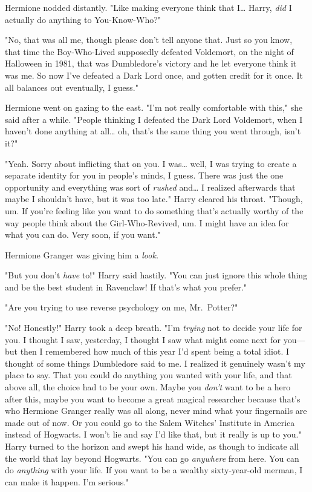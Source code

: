 Hermione nodded distantly. "Like making everyone think that I{\ldots} Harry,
\emph{did} I actually do anything to You-Know-Who?"

"No, that was all me, though please don't tell anyone that. Just so you know,
that time the Boy-Who-Lived supposedly defeated Voldemort, on the night of
Halloween in 1981, that was Dumbledore's victory and he let everyone think it
was me. So now I've defeated a Dark Lord once, and gotten credit for it once.
It all balances out eventually, I guess."

Hermione went on gazing to the east. "I'm not really comfortable with this,"
she said after a while. "People thinking I defeated the Dark Lord Voldemort,
when I haven't done anything at all{\ldots} oh, that's the same thing you went
through, isn't it?"

"Yeah. Sorry about inflicting that on you. I was{\ldots} well, I was trying to
create a separate identity for you in people's minds, I guess. There was just
the one opportunity and everything was sort of \emph{rushed} and{\ldots} I
realized afterwards that maybe I shouldn't have, but it was too late." Harry
cleared his throat. "Though, um. If you're feeling like you want to do
something that's actually worthy of the way people think about the
Girl-Who-Revived, um. I might have an idea for what you can do. Very soon, if
you want."

Hermione Granger was giving him a \emph{look.}

"But you don't \emph{have} to!" Harry said hastily. "You can just ignore this
whole thing and be the best student in Ravenclaw! If that's what you prefer."

"Are you trying to use reverse psychology on me, Mr.~Potter?"

"No! Honestly!" Harry took a deep breath. "I'm \emph{trying} not to decide your
life for you. I thought I saw, yesterday, I thought I saw what might come next
for you---but then I remembered how much of this year I'd spent being a total
idiot. I thought of some things Dumbledore said to me. I realized it genuinely
wasn't my place to say. That you could do anything you wanted with your life,
and that above all, the choice had to be your own. Maybe you \emph{don't} want
to be a hero after this, maybe you want to become a great magical researcher
because that's who Hermione Granger really was all along, never mind what your
fingernails are made out of now. Or you could go to the Salem Witches'
Institute in America instead of Hogwarts. I won't lie and say I'd like that,
but it really is up to you." Harry turned to the horizon and swept his hand
wide, as though to indicate all the world that lay beyond Hogwarts. "You can go
\emph{anywhere} from here. You can do \emph{anything} with your life. If you
want to be a wealthy sixty-year-old merman, I can make it happen. I'm serious."

